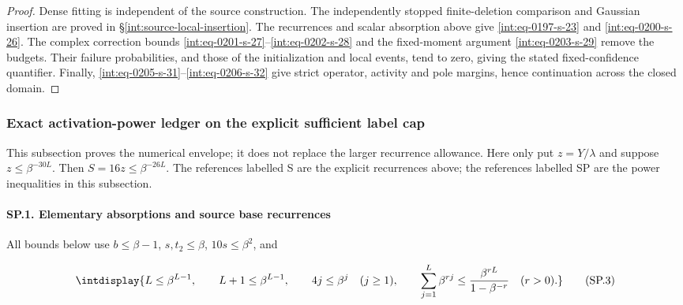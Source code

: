 \begin{proof}
Dense fitting is independent of the source construction.
The independently stopped finite-deletion comparison and Gaussian
insertion are proved in \S\ref{int:source-local-insertion}.
The recurrences and scalar absorption above give
\eqref{int:eq-0197-s-23} and \eqref{int:eq-0200-s-26}.
The complex correction bounds
\eqref{int:eq-0201-s-27}--\eqref{int:eq-0202-s-28} and the
fixed-moment argument \eqref{int:eq-0203-s-29} remove the budgets.
Their failure probabilities, and those of the initialization and local
events, tend to zero, giving the stated fixed-confidence quantifier.
Finally, \eqref{int:eq-0205-s-31}--\eqref{int:eq-0206-s-32}
give strict operator, activity and pole margins, hence continuation
across the closed domain.
\end{proof}


\subsubsection{Exact activation-power ledger on the explicit sufficient label cap}
\label{int:source-power-ledger}


This subsection proves the numerical envelope; it does not replace the larger recurrence allowance. Here only put \(z=Y/\lambda\) and suppose \(z\le\beta^{-30L}\). Then \(S=16z\le\beta^{-26L}\). The references labelled S are the explicit recurrences above; the references labelled SP are the power inequalities in this subsection.


\paragraph{SP.1. Elementary absorptions and source base recurrences}

\mbox{}\par\smallskip


All bounds below use \(b\le\beta-1\), \(s,\allowbreak t_2\le\beta\), \(10s\le\beta^2\), and


\begingroup\renewcommand{\theHequation}{intdisplay.421}
\begin{equation}
\intdisplay{
L\le\beta^{L-1},\qquad L+1\le\beta^{L-1},\qquad
4j\le\beta^j\quad(j\ge1),\qquad
\sum_{j=1}^L\beta^{rj}\le
\frac{\beta^{rL}}{1-\beta^{-r}}\quad(r>0).
}
\tag{SP.3}
\label{int:eq-0207-sp-3}
\end{equation}
\endgroup


